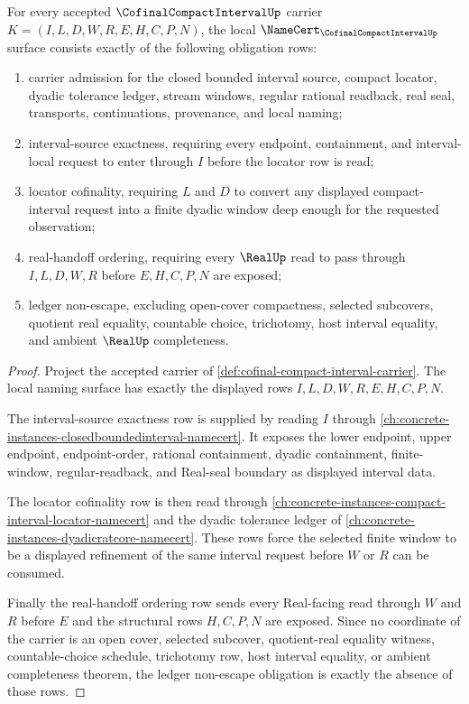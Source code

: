 \begin{theorem}
\label{thm:cofinal-compact-interval-namecert-obligations}
For every accepted $\CofinalCompactIntervalUp$ carrier $K=(I,L,D,W,R,E,H,C,P,N)$, the local $\NameCert_{\CofinalCompactIntervalUp}$ surface consists exactly of the following obligation rows:
\begin{enumerate}
\item carrier admission for the closed bounded interval source, compact locator, dyadic tolerance ledger, stream windows, regular rational readback, real seal, transports, continuations, provenance, and local naming;
\item interval-source exactness, requiring every endpoint, containment, and interval-local request to enter through $I$ before the locator row is read;
\item locator cofinality, requiring $L$ and $D$ to convert any displayed compact-interval request into a finite dyadic window deep enough for the requested observation;
\item real-handoff ordering, requiring every $\RealUp$ read to pass through $I,L,D,W,R$ before $E,H,C,P,N$ are exposed;
\item ledger non-escape, excluding open-cover compactness, selected subcovers, quotient real equality, countable choice, trichotomy, host interval equality, and ambient $\RealUp$ completeness.
\end{enumerate}
\end{theorem}
\begin{proof}
Project the accepted carrier of \autoref{def:cofinal-compact-interval-carrier}. The local naming surface has exactly the displayed rows $I,L,D,W,R,E,H,C,P,N$.

The interval-source exactness row is supplied by reading $I$ through \autoref{ch:concrete-instances-closedboundedinterval-namecert}. It exposes the lower endpoint, upper endpoint, endpoint-order, rational containment, dyadic containment, finite-window, regular-readback, and Real-seal boundary as displayed interval data.

The locator cofinality row is then read through \autoref{ch:concrete-instances-compact-interval-locator-namecert} and the dyadic tolerance ledger of \autoref{ch:concrete-instances-dyadicratcore-namecert}. These rows force the selected finite window to be a displayed refinement of the same interval request before $W$ or $R$ can be consumed.

Finally the real-handoff ordering row sends every Real-facing read through $W$ and $R$ before $E$ and the structural rows $H,C,P,N$ are exposed. Since no coordinate of the carrier is an open cover, selected subcover, quotient-real equality witness, countable-choice schedule, trichotomy row, host interval equality, or ambient completeness theorem, the ledger non-escape obligation is exactly the absence of those rows.
\end{proof}

